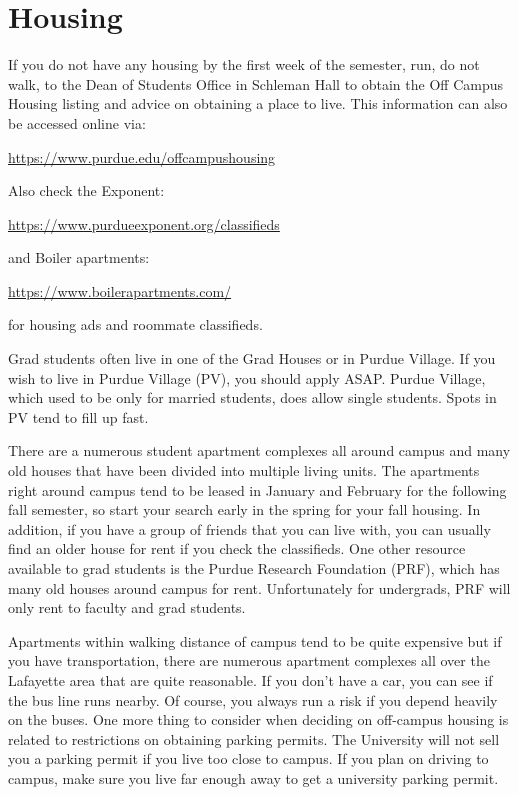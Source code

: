 \section{Housing}

If you do not have any housing by the first week of the semester, run, do not walk, to the Dean of Students Office in Schleman Hall to obtain the Off Campus Housing listing and advice on obtaining a place to live. This information can also be accessed online via:

\centerline{\url{https://www.purdue.edu/offcampushousing}}
\vspace{\baselineskip}

Also check the Exponent:

\centerline{\url{https://www.purdueexponent.org/classifieds}}

and Boiler apartments:

\centerline{\url{https://www.boilerapartments.com/}}

for housing ads and roommate classifieds.
\vspace{\baselineskip}

Grad students often live in one of the Grad Houses or in Purdue Village. If you wish to live in Purdue Village (PV), you should apply ASAP. Purdue Village, which used to be only for married students, does allow single students. Spots in PV tend to fill up fast.

There are a numerous student apartment complexes all around campus and many old houses that have been divided into multiple living units. The apartments right around campus tend to be leased in January and February for the following fall semester, so start your search early in the spring for your fall housing. In addition, if you have a group of friends that you can live with, you can usually find an older house for rent if you check the classifieds. One other resource available to grad students is the Purdue Research Foundation (PRF), which has many old houses around campus for rent. Unfortunately for undergrads, PRF will only rent to faculty and grad students.

Apartments within walking distance of campus tend to be quite expensive but if you have transportation, there are numerous apartment complexes all over the Lafayette area that are quite reasonable. If you don't have a car, you can see if the bus line runs nearby. Of course, you always run a risk if you depend heavily on the buses. One more thing to consider when deciding on off-campus housing is related to restrictions on obtaining parking permits. The University will not sell you a parking permit if you live too close to campus. If you plan on driving to campus, make sure you live far enough away to get a university parking permit.

